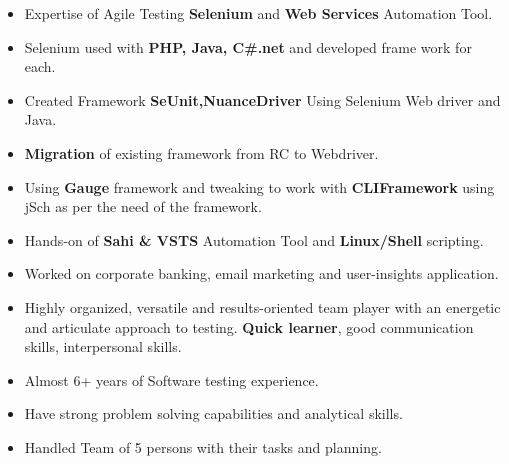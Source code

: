 

\begin{cvparagraph}

\begin{itemize}
 \item {Expertise of Agile Testing \textbf{Selenium} and \textbf{Web Services} Automation Tool.}

 \item {Selenium used with \textbf{PHP, Java, C\#.net} and developed frame work for each.}

 \item {Created Framework \textbf{SeUnit,NuanceDriver} Using Selenium Web driver and Java.}

 \item {\textbf{Migration} of existing framework from RC to Webdriver.}

 \item {Using \textbf{Gauge} framework and tweaking to work with \textbf{CLIFramework} using jSch as per the need of the framework.}

 \item {Hands-on of \textbf{Sahi \& VSTS} Automation Tool and \textbf{Linux/Shell} scripting.}

 \item {Worked on corporate banking, email marketing and user-insights application.}

 \item {Highly organized, versatile and results-oriented team player with an energetic and articulate approach to testing. \textbf{Quick learner}, good communication skills, interpersonal skills.}

 \item {Almost 6+ years of Software testing experience.}

 \item {Have strong problem solving capabilities and analytical skills.}

 \item {Handled Team of 5 persons with their tasks and planning.}
\end{itemize}
\end{cvparagraph}

